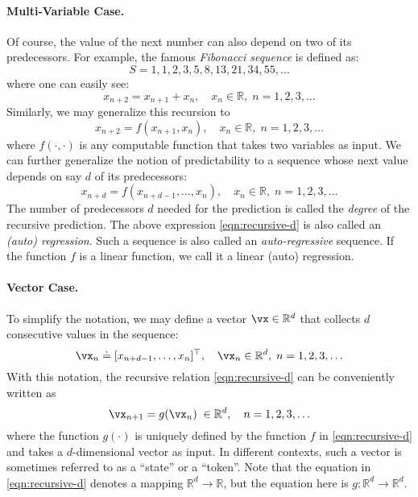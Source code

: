 \documentclass[../../book-main.tex]{subfiles}
\begin{document}
\paragraph{Multi-Variable Case.}
Of course, the value of the next number can also depend on two of its predecessors. For example, the famous {\em Fibonacci sequence} is defined as:
\begin{equation}
    {S} = 1, 1, 2, 3, 5, 8, 13, 21, 34, 55, \ldots
\end{equation}
where one can easily see:
\begin{equation}
    x_{n+2} = x_{n+1} + x_{n}, \quad  x_n \in \mathbb{R}, \;  n = 1, 2, 3, \ldots
\end{equation}
Similarly, we may generalize this recursion to \begin{equation}
    x_{n+2} = f(x_{n+1}, x_{n}), \quad x_n \in \mathbb{R}, \;  n =  1, 2, 3, \ldots
\end{equation}
where $f(\cdot,\cdot)$ is any computable function that takes two variables as input. We can further generalize the notion of predictability to a sequence whose next value depends on say $d$ of its predecessors:
\begin{equation}
    x_{n+d} = f(x_{n+d-1}, \ldots,  x_{n}), \quad  x_n \in \mathbb{R}, \; n =  1, 2, 3, \ldots
    \label{eqn:recursive-d}
\end{equation}
The number of predecessors $d$ needed for the prediction is called the {\em degree} of the recursive prediction. The above expression \eqref{eqn:recursive-d} is also called an {\em (auto) regression}. Such a sequence is also called an {\em auto-regressive} sequence. If the function $f$ is a linear function, we call it a linear (auto) regression. 

\paragraph{Vector Case.} 
To simplify the notation, we may define a vector $\vx \in \mathbb{R}^d$ that collects $d$ consecutive values in the sequence: \begin{equation}
    \vx_n \doteq [x_{n+d-1}, \ldots,  x_{n}]^\top, \quad \vx_n \in \mathbb{R}^d, \; n = 1, 2, 3, \ldots
\end{equation}
With this notation, the recursive relation \eqref{eqn:recursive-d} can be conveniently written as
\begin{equation}
    \vx_{n+1} = g(\vx_{n}) \; \in \mathbb{R}^d, \quad n =  1, 2, 3, \ldots
    \label{eqn:recursive-v}
\end{equation}
where the function $g(\cdot)$ is uniquely defined by the function $f$ in \eqref{eqn:recursive-d} and takes a $d$-dimensional vector as input. In different contexts, such a vector is sometimes referred to as a ``state'' or a ``token''. Note that the equation in \eqref{eqn:recursive-d} denotes a mapping $\mathbb{R}^d \rightarrow \mathbb{R}$, but the equation here is $g: \mathbb{R}^d \rightarrow \mathbb{R}^d$.
\end{document}
